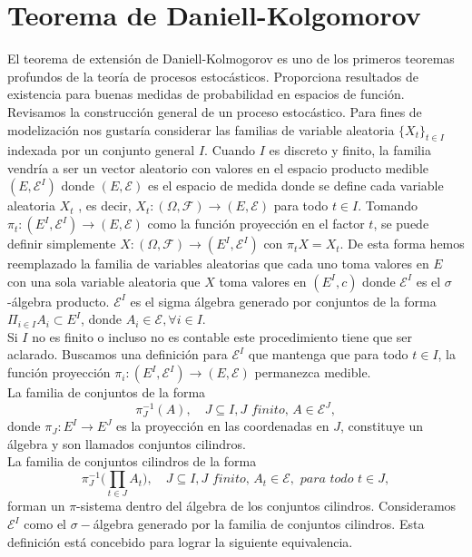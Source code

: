 \section{Teorema de Daniell-Kolgomorov}
    El teorema de extensión de Daniell-Kolmogorov es uno de los primeros teoremas profundos de la teoría de procesos estocásticos. Proporciona resultados de existencia para buenas medidas de probabilidad en espacios de función.
    Revisamos la construcción general de un proceso estocástico.
    Para fines de modelización nos gustaría considerar las familias de variable aleatoria $\{X_t\}_{t\in I}$ indexada por un conjunto general $I$. Cuando $I$ es discreto y finito, la familia vendría a ser un vector aleatorio con valores en el espacio producto medible $(E,\mathscr{E}^I)$ donde  $(E, \mathscr{E})$  es el espacio de medida donde se define cada variable aleatoria $X_t$ , es decir, $X_t:(\Omega, \mathscr{F}) \rightarrow (E, \mathscr{E})$ para todo $t\in I$.
     Tomando $\pi_t: (E^I,  \mathscr{E}^I) \rightarrow (E,  \mathscr{E})$ como la función proyección en el factor $t$, se puede definir simplemente $X:(\Omega, \mathscr{F})\rightarrow (E^I,  \mathscr{E}^I)$ con $\pi_t X = X_t$.
      De esta forma hemos reemplazado la familia de variables aleatorias  que  cada uno toma valores en $E$ con una sola variable aleatoria que $X$ toma valores en $(E^I, c )$ donde $\mathscr{E}^I$  es el  $\sigma$-álgebra producto.
    $\mathscr{E}^I$ es el sigma álgebra generado por conjuntos de la forma $\Pi_{i\in I}{A_i}\subset E^I$, donde $A_i\in\mathscr{E}, \forall i\in I$.\\
    Si $I$ no es finito o incluso no es contable este procedimiento tiene que ser aclarado.
    Buscamos una definición para $\mathscr{E}^I$ que mantenga que para todo $t\in I$, la función proyección $\pi_i: (E^I,\mathscr{E}^I)\rightarrow (E,\mathscr{E})$ permanezca medible.
    \\La familia de conjuntos de la forma $$\pi^{-1}_J(A), \quad J\subseteq I, \textit{J finito, }A\in\mathscr{E}^J,$$  donde $\pi_J :E^I\rightarrow E^J$	 es la proyección en las coordenadas en $J$, constituye un álgebra y son llamados conjuntos cilindros. 
    \\La familia de conjuntos cilindros de la forma  $$\pi^{-1}_J\bigg(\prod_{t\in J}A_t\bigg), \quad J\subseteq I, \textit{J finito, }A_t\in\mathscr{E}, \textit{ para todo }t\in J,$$
    forman un $\pi$-sistema dentro del álgebra de los conjuntos cilindros.
    Consideramos $\mathscr{E}^I$ como el $\sigma-$álgebra generado por la familia de conjuntos cilindros.
    Esta definición está concebido para lograr la siguiente equivalencia.
